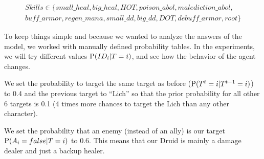 \begin{eqnarray*}
Skills \in \{ small\_heal, big\_heal, HOT, poison\_abol, malediction\_abol,\\
            buff\_armor, regen\_mana, small\_dd, big\_dd, DOT, debuff\_armor, root \}
\end{eqnarray*}

To keep things simple and because we wanted to analyze the answers of the model, we worked with manually defined probability tables. %
In the experiments, we will try different values %
$\mathrm{P}(ID_i | T=i)$, and see how the behavior of the agent changes. 

We set the probability to target the same target as before ($\mathrm{P}(T^t=i|T^{t-1}=i)$) to 0.4 and the previous target to ``Lich'' so that the prior probability for all other 6 targets is 0.1 (4 times more chances to target the Lich than any other character). 

We set the probability that an enemy (instead of an ally) is our target $\mathrm{P}(A_i=false|T=i)$ to 0.6. This means that our Druid is mainly a damage dealer and just a backup healer. 

